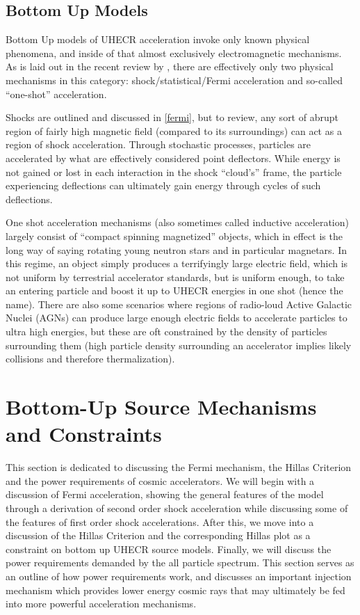\subsection{Bottom Up Models}
\label{bottomups}
Bottom Up models of UHECR acceleration invoke only known physical phenomena, and inside of that almost exclusively electromagnetic mechanisms. As is laid out in the recent review by , there are effectively only two physical mechanisms in this category: shock/statistical/Fermi acceleration and so-called ``one-shot'' acceleration. 

Shocks are outlined and discussed in \autoref{fermi}, but to review, any sort of abrupt region of fairly high magnetic field (compared to its surroundings) can act as a region of shock acceleration. Through stochastic processes, particles are accelerated by what are effectively considered point deflectors. While energy is not gained or lost in each interaction in the shock ``cloud's'' frame, the particle experiencing deflections can ultimately gain energy through cycles of such deflections.

One shot acceleration mechanisms (also sometimes called inductive acceleration) largely consist of ``compact spinning magnetized'' objects, which in effect is the long way of saying rotating young neutron stars and in particular magnetars. In this regime, an object simply produces a terrifyingly large electric field, which is not uniform by terrestrial accelerator standards, but is uniform enough, to take an entering particle and boost it up to UHECR energies in one shot (hence the name). There are also some scenarios where regions of radio-loud Active Galactic Nuclei (AGNs) can produce large enough electric fields to accelerate particles to ultra high energies, but these are oft constrained by the density of particles surrounding them (high particle density surrounding an accelerator implies likely collisions and therefore thermalization). 




\section{Bottom-Up Source Mechanisms and Constraints}
\label{mechcon}
This section is dedicated to discussing the Fermi mechanism, the Hillas Criterion and the power requirements of cosmic accelerators. We will begin with a discussion of Fermi acceleration, showing the general features of the model through a derivation of second order shock acceleration while discussing some of the features of first order shock accelerations. After this, we move into a discussion of the Hillas Criterion and the corresponding Hillas plot as a constraint on bottom up UHECR source models. Finally, we will discuss the power requirements demanded by the all particle spectrum. This section serves as an outline of how power requirements work, and discusses an important injection mechanism which provides lower energy cosmic rays that may ultimately be fed into more powerful acceleration mechanisms.


